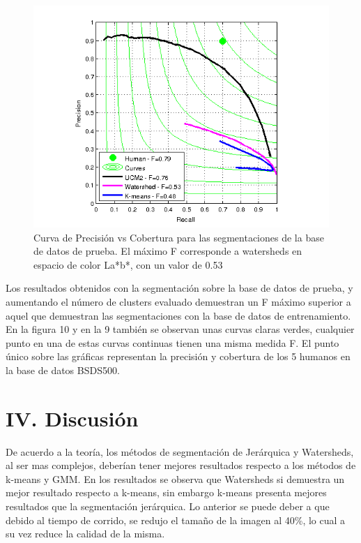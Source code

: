 \documentclass[10pt,twocolumn,letterpaper]{article}
\begin{document}
\begin{figure}[H]
\begin{center}
   \includegraphics[scale = 0.65]{curve2}
\end{center}
   \caption{Curva de Precisión vs Cobertura para las segmentaciones de la base de datos de prueba. El máximo F corresponde a watersheds en espacio de color La*b*, con un valor de 0.53}
\end{figure}

Los resultados obtenidos con la segmentación sobre la base de datos de prueba, y aumentando el número de clusters evaluado demuestran un F máximo superior a aquel que demuestran las segmentaciones con la base de datos de entrenamiento. En la figura 10 y en la 9 también se observan unas curvas claras verdes, cualquier punto en una de estas curvas continuas tienen una misma medida F. El punto único sobre las gráficas representan la precisión y cobertura de los 5 humanos en la base de datos BSDS500. 

\section{\textbf{IV. Discusión}}
De acuerdo a la teoría, los métodos de segmentación de Jerárquica y Watersheds, al ser mas complejos, deberían tener mejores resultados respecto a los métodos de k-means y GMM. En los resultados se observa que Watersheds si demuestra un mejor resultado respecto a k-means, sin embargo k-means presenta mejores resultados que la segmentación jerárquica. Lo anterior se puede deber a que debido al tiempo de corrido, se redujo el tamaño de la imagen al 40\%, lo cual a su vez reduce la calidad de la misma.
\end{document}
